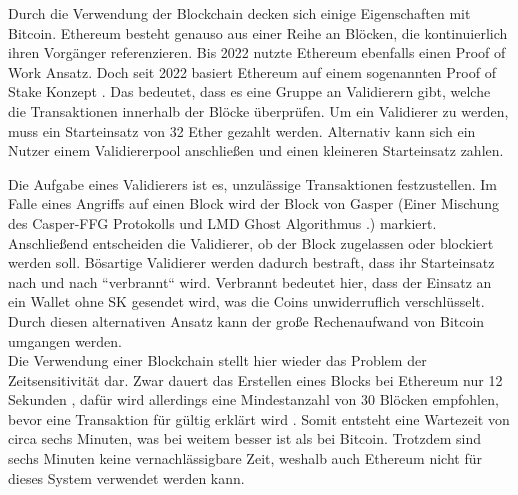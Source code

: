 \documentclass[
	fontsize=11pt,
	headings=small,
	parskip=half,           %
	bibliography=totoc,
	numbers=noenddot,       %
	open=any,               %
]{scrreprt}
\begin{document}
Durch die Verwendung der Blockchain decken sich einige Eigenschaften mit Bitcoin. Ethereum besteht genauso aus einer Reihe an Blöcken, die kontinuierlich ihren Vorgänger referenzieren. Bis 2022 nutzte Ethereum ebenfalls einen Proof of Work Ansatz. Doch seit 2022 basiert Ethereum auf einem sogenannten Proof of Stake Konzept \cite{eth-explainerInvestopia}. Das bedeutet, dass es eine Gruppe an Validierern gibt, welche die Transaktionen innerhalb der Blöcke überprüfen. Um ein Validierer zu werden, muss ein Starteinsatz von 32 Ether gezahlt werden. Alternativ kann sich ein Nutzer einem Validiererpool anschließen und einen kleineren Starteinsatz zahlen.

Die Aufgabe eines Validierers ist es, unzulässige Transaktionen festzustellen. Im Falle eines Angriffs auf einen Block wird der Block von Gasper (Einer Mischung des Casper-FFG Protokolls und LMD Ghost Algorithmus \cite{eth-buterin2020combining}.) markiert. Anschließend entscheiden die Validierer, ob der Block zugelassen oder blockiert werden soll. Bösartige Validierer werden dadurch bestraft, dass ihr Starteinsatz nach und nach ``verbrannt`` wird. Verbrannt bedeutet hier, dass der Einsatz an ein Wallet ohne SK gesendet wird, was die Coins unwiderruflich verschlüsselt. Durch diesen alternativen Ansatz kann der große Rechenaufwand von Bitcoin umgangen werden.\\

Die Verwendung einer Blockchain stellt hier wieder das Problem der Zeitsensitivität dar. Zwar dauert das Erstellen eines Blocks bei Ethereum nur 12 Sekunden \cite{eth-timePerBlock}, dafür wird allerdings eine Mindestanzahl von 30 Blöcken empfohlen, bevor eine Transaktion für gültig erklärt wird . Somit entsteht eine Wartezeit von circa sechs Minuten, was bei weitem besser ist als bei Bitcoin. Trotzdem sind sechs Minuten keine vernachlässigbare Zeit, weshalb auch Ethereum nicht für dieses System verwendet werden kann.
\end{document}
